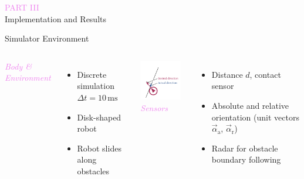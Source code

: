 \documentclass[aspectratio=169]{beamer}
\begin{document}
\begin{frame}
\centering
{\Large\textcolor{violet}{\textsc{PART III}}}\\
\huge Implementation and Results
\end{frame}

\begin{frame}{Simulator Environment}
	\begin{columns}[t]
		\emph{\textcolor{violet}{Body \& Environment}}
		\begin{itemize}
			\item Discrete simulation $\Delta t = 10\,\mathrm{ms}$
			\item Disk-shaped robot
			\item Robot slides along obstacles
		\end{itemize}
		\centering
		\includegraphics[width=0.9\textwidth]{media/assumptions_sketch_slide.pdf}
		\emph{\textcolor{violet}{Sensors}}
		\begin{itemize}
			\item Distance $d$, contact sensor
			\item Absolute and relative orientation (unit vectors $\vec \alpha_\mathrm{a}$, $\vec \alpha_\mathrm{r}$)
			\item Radar for obstacle boundary following
		\end{itemize}
		\centering

\end{columns}
\end{frame}
\end{document}
